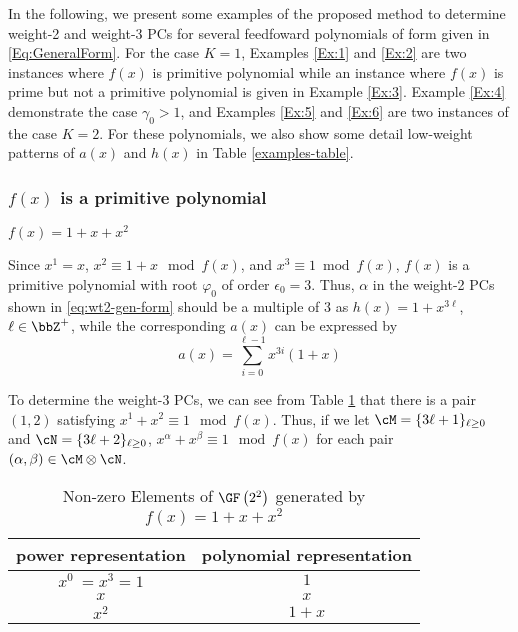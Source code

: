 In the following, we present some examples of the proposed method to determine weight-2 and weight-3 PCs for several feedfoward polynomials of form given in \eqref{Eq:GeneralForm}. For the case $K=1$, Examples \ref{Ex:1} and \ref{Ex:2} are two instances where $f(x)$ is primitive polynomial while an instance where $f(x)$ is prime but not a primitive polynomial is given in Example \ref{Ex:3}. Example \ref{Ex:4} demonstrate the case $\gamma_0 > 1$, and Examples \ref{Ex:5} and \ref{Ex:6} are two instances of the case $K=2$. For these polynomials, we also show some detail low-weight patterns of $a(x)$ and $h(x)$ in Table \ref{examples-table}.

\subsubsection{$f(x)$ is a primitive polynomial}

\begin{example}$f(x)=1+x+x^2$
	
Since $x^1=x$, $x^2 \equiv 1+x \mod f(x)$, and $x^3 \equiv 1 \bmod f(x)$, $f(x)$ is a primitive polynomial with root $\varphi_0$ of order $\epsilon_0=3$. Thus, $\alpha$ in the weight-2 PCs shown in \eqref{eq:wt2-gen-form} should be a multiple of $3$ as $h(x)=1+x^{3\ell}$, $\ell \in \bbZ^+$, while the corresponding $a(x)$ can be expressed by 
\begin{equation*}
	a(x)=\sum_{i=0}^{\ell-1} x^{3i}(1+x)
\end{equation*}

To determine the weight-3 PCs, we can see from Table \ref{novelTab7} that there is a pair $(1,2)$ satisfying $x^1+x^2 \equiv 1 \mod f(x)$. Thus, if we let $\cM = \{3\ell+1\}_{\ell\geq 0}$ and $\cN = \{3\ell+2\}_{\ell\geq 0}$, $x^\alpha+x^\beta \equiv 1 \mod f(x)$ for each pair $(\alpha,\beta) \in \cM\otimes\cN$.
\label{Ex:1}
\end{example}

\begin{table}[htbp]
	\caption{Non-zero Elements of $\GF \left(2^2\right)$ generated by $f(x)=1+x+x^2$}
	\centering
	\begin{tabular}{c c} 
		\toprule
		power representation & polynomial representation \\ [0.5ex] 
		\midrule
		$x^0~=x^3=1$ & $1$\\
		\hline
		$x$ & $x$\\
		\hline
		$x^2$ &  $1+x$\\
		\bottomrule
	\end{tabular}
	\label{novelTab7}
\end{table}

